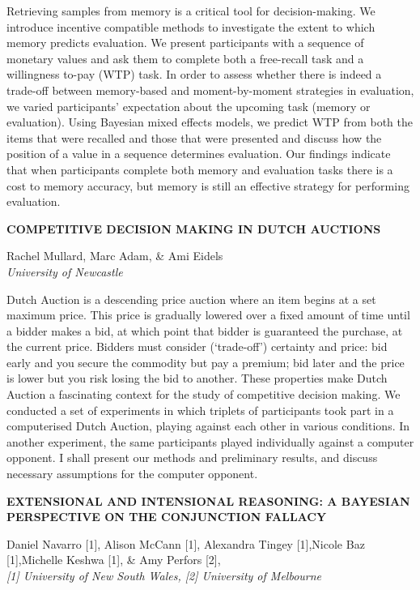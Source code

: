 \documentclass[]{article}
\begin{document}
Retrieving samples from memory is a critical tool for decision-making.
We introduce incentive compatible methods to investigate the extent to
which memory predicts evaluation. We present participants with a
sequence of monetary values and ask them to complete both a free-recall
task and a willingness to-pay (WTP) task. In order to assess whether
there is indeed a trade-off between memory-based and moment-by-moment
strategies in evaluation, we varied participants' expectation about the
upcoming task (memory or evaluation). Using Bayesian mixed effects
models, we predict WTP from both the items that were recalled and those
that were presented and discuss how the position of a value in a
sequence determines evaluation. Our findings indicate that when
participants complete both memory and evaluation tasks there is a cost
to memory accuracy, but memory is still an effective strategy for
performing evaluation.\\
\pagebreak  

\textbf{COMPETITIVE DECISION MAKING IN DUTCH AUCTIONS}

Rachel Mullard, Marc Adam, \& Ami Eidels\\
\emph{University of Newcastle}

Dutch Auction is a descending price auction where an item begins at a
set maximum price. This price is gradually lowered over a fixed amount
of time until a bidder makes a bid, at which point that bidder is
guaranteed the purchase, at the current price. Bidders must consider
(`trade-off') certainty and price: bid early and you secure the
commodity but pay a premium; bid later and the price is lower but you
risk losing the bid to another. These properties make Dutch Auction a
fascinating context for the study of competitive decision making. We
conducted a set of experiments in which triplets of participants took
part in a computerised Dutch Auction, playing against each other in
various conditions. In another experiment, the same participants played
individually against a computer opponent. I shall present our methods
and preliminary results, and discuss necessary assumptions for the
computer opponent.\\
\pagebreak  

\textbf{EXTENSIONAL AND INTENSIONAL REASONING: A BAYESIAN PERSPECTIVE ON
THE CONJUNCTION FALLACY}

Daniel Navarro {[}1{]}, Alison McCann {[}1{]}, Alexandra Tingey
{[}1{]},Nicole Baz {[}1{]},Michelle Keshwa {[}1{]}, \& Amy Perfors
{[}2{]},\\
\emph{{[}1{]} University of New South Wales, {[}2{]} University of
Melbourne}
\end{document}
